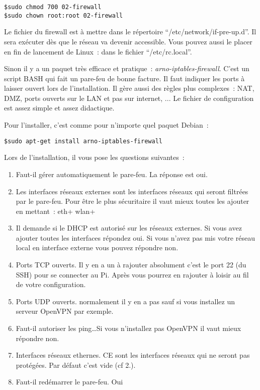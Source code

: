 \begin{verbatim}
$sudo chmod 700 02-firewall
$sudo chown root:root 02-firewall
\end{verbatim}

Le fichier du firewall est à mettre dans le répertoire ``/etc/network/if-pre-up.d''. Il sera exécuter dès que le réseau va devenir accessible. Vous pouvez aussi le placer en fin de lancement de Linux~: dans le fichier ``/etc/rc.local''.

Sinon il y a un paquet très efficace et pratique~: \emph{arno-iptables-firewall}. C'est un script BASH qui fait un pare-feu de bonne facture. Il faut indiquer les ports à laisser ouvert lors de l'installation. Il gère aussi des règles plus complexes~: NAT, DMZ, ports ouverts sur le LAN et pas sur internet, ... Le fichier de configuration est assez simple et assez didactique.

Pour l'installer, c'est comme pour n'importe quel paquet Debian~:
\begin{verbatim}
$sudo apt-get install arno-iptables-firewall
\end{verbatim}

Lors de l'installation, il vous pose les questions suivantes~:
\begin{enumerate}
	\item Faut-il gérer automatiquement le pare-feu. La réponse est oui.
	\item Les interfaces réseaux externes sont les interfaces réseaux qui seront filtrées par le pare-feu. Pour être le plus sécuritaire il vaut mieux toutes les ajouter en mettant~: eth+ wlan+
	\item Il demande si le DHCP est autorisé sur les réseaux externes. Si vous avez ajouter toutes les interfaces répondez oui. Si vous n'avez pas mis votre réseau local en interface externe vous pouvez répondre non.
	\item Ports TCP ouverts. Il y en a un à rajouter absolument c'est le port 22 (du SSH) pour se connecter au Pi. Après vous pourrez en rajouter à loisir au fil de votre configuration.
	\item Ports UDP ouverts. normalement il y en a pas sauf si vous installez un serveur OpenVPN par exemple.
	\item Faut-il autoriser les ping\dots Si vous n'installez pas OpenVPN il vaut mieux répondre non. 
	\item Interfaces réseaux ethernes. CE sont les interfaces réseaux qui ne seront pas protégées. Par défaut c'est vide (cf 2.).
	\item Faut-il redémarrer le pare-feu. Oui
\end{enumerate}

